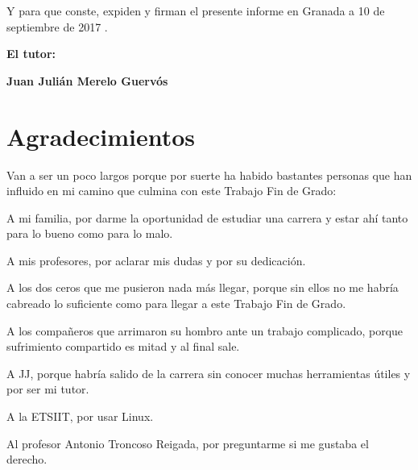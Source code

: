\vspace{0.5cm}

Y para que conste, expiden y firman el presente informe en Granada a 10 de septiembre de 2017 .

\vspace{1cm}

\textbf{El tutor:}

\vspace{5cm}

\noindent \textbf{Juan Julián Merelo Guervós}

\chapter*{Agradecimientos}
\thispagestyle{empty}

       \vspace{1cm}



Van a ser un poco largos porque por suerte ha habido bastantes personas que han influido en mi camino que culmina con este Trabajo Fin de Grado:\par 
\medskip

A mi familia, por darme la oportunidad de estudiar una carrera y estar ahí tanto para lo bueno como para lo malo.\par
\medskip

A mis profesores, por aclarar mis dudas y por su dedicación.\par
\medskip

A los dos ceros que me pusieron nada más llegar, porque sin ellos no me habría cabreado lo suficiente como para llegar a este Trabajo Fin de Grado.\par
\medskip

A los compañeros que arrimaron su hombro ante un trabajo complicado, porque sufrimiento compartido es mitad y al final sale.\par
\medskip

A JJ, porque habría salido de la carrera sin conocer muchas herramientas útiles y por ser mi tutor.\par
\medskip

A la ETSIIT, por usar Linux.\par
\medskip

Al profesor Antonio Troncoso Reigada, por preguntarme si me gustaba el derecho.\par

